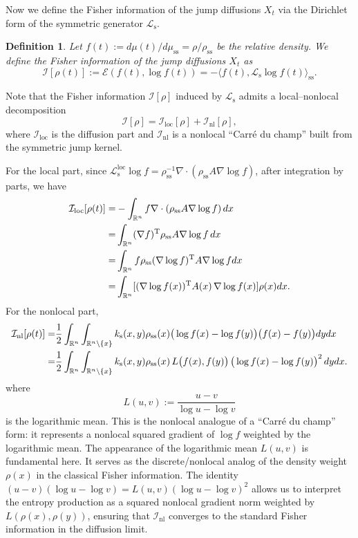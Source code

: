 \documentclass[10pt]{article}
\newtheorem{definition}{Definition}[section]
\theoremstyle{definition}
\numberwithin{equation}{section}
\begin{document}
Now we define the Fisher information of the jump diffusions $X_t$ via the Dirichlet form of the symmetric generator $\mathcal{L}_\mathrm{s}$.

\begin{definition}
Let $f(t):= d\mu(t)/d\mu_\mathrm{ss} =\rho/\rho_\mathrm{ss}$ be the relative density. We define the Fisher information of the jump diffusions $X_t$ as
\[
\mathcal{I}[\rho(t)]
:= \mathcal{E}(f(t),\log f(t))
= -\langle f(t), \mathcal{L}_\mathrm{s} \log f(t)\rangle_\mathrm{ss}.
\]
\end{definition}
Note that the Fisher information $\mathcal{I}[\rho]$ induced by $\mathcal{L}_\mathrm{s}$ admits a local--nonlocal decomposition
\[
\mathcal{I}[\rho]
= \mathcal{I}_{\mathrm{loc}}[\rho] + \mathcal{I}_{\mathrm{nl}}[\rho],
\]
where $\mathcal{I}_{\mathrm{loc}}$ is the diffusion part and $\mathcal{I}_{\mathrm{nl}}$ is a nonlocal ``Carr\'e du champ'' built from the symmetric jump kernel. 

For the local part, since
$ \mathcal{L}^\mathrm{loc}_\mathrm{s}\log f
= \rho_\mathrm{ss}^{-1}\nabla\cdot(\rho_\mathrm{ss}A\nabla\log f)$, after integration by parts, we have
\begin{align*}
    \mathcal{I}_{\rm loc}[\rho(t)] = &  -\int_{\mathbb{R}^n} f \nabla\cdot(\rho_\mathrm{ss}A\nabla\log f)\,dx\\
    = & \int_{\mathbb{R}^n} (\nabla f)^\mathrm{T}\rho_\mathrm{ss}A\nabla\log f\,dx \\
 = & \int_{\mathbb{R}^n} f\rho_\mathrm{ss}(\nabla\log f)^\mathrm{T}A\nabla\log f dx \\ 
 = & \int_{\mathbb{R}^n} [(\nabla\log f(x))^\mathrm{T} A(x)\, \nabla\log f(x)]\rho(x)dx.
\end{align*}
For the nonlocal part,
\begin{align*}
\mathcal{I}_{\rm nl}[\rho(t)]
=  & \frac12\int_{\mathbb{R}^n}\int_{\mathbb{R}^n\setminus \{x\}}
k_\mathrm{s}(x,y)\rho_\mathrm{ss}(x)
\big(\log f(x)-\log f(y)\big)
\big(f(x)-f(y)\big) dydx \\
    = & \frac12 \int_{\mathbb{R}^n}\int_{\mathbb{R}^n\setminus \{x\}}
k_\mathrm{s}(x,y)\rho_\mathrm{ss}(x)\,
L\big(f(x),f(y)\big)\,
\big(\log f(x)-\log f(y)\big)^2\,
dydx.
\end{align*}
where
\[
L(u,v):=\frac{u-v}{\log u - \log v}
\]
is the logarithmic mean.  
This is the nonlocal analogue of a ``Carr\'e du champ'' form:
it represents a nonlocal squared gradient of $\log f$ weighted by the logarithmic mean.
The appearance of the logarithmic mean $L(u, v)$ is fundamental here. It serves as the discrete/nonlocal analog of the density weight $\rho(x)$ in the classical Fisher information. The identity $(u-v)(\log u - \log v) = L(u,v)(\log u - \log v)^2$ allows us to interpret the entropy production as a squared nonlocal gradient norm weighted by $L(\rho(x), \rho(y))$, ensuring that $\mathcal{I}_{\mathrm{nl}}$ converges to the standard Fisher information in the diffusion limit.
\end{document}
